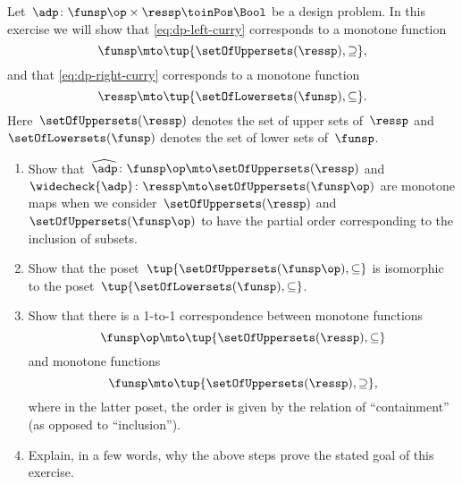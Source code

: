 \begin{gradedexercise}
    \label{ex:CurryingDesignProblems}
    Let~$\adp\colon \funsp\op \times \ressp\toinPos \Bool$ be a design problem.
    In this exercise we will show that \cref{eq:dp-left-curry} corresponds to a monotone function
    \begin{equation}
        \funsp \mto \tup{\setOfUppersets (\ressp), \supseteq},
    \end{equation}
    and that \cref{eq:dp-right-curry} corresponds to a monotone function
    \begin{equation}
        \ressp \mto \tup{\setOfLowersets(\funsp), \subseteq}.
    \end{equation}
    Here~$\setOfUppersets (\ressp)$ denotes the set of upper sets of~$\ressp$ and~$\setOfLowersets(\funsp)$ denotes the set of lower sets of~$\funsp$.

    \begin{enumerate}
        \item Show that~$\widehat{\adp} \colon \funsp\op \mto \setOfUppersets (\ressp)$ and~$\widecheck{\adp} \colon \ressp \mto \setOfUppersets (\funsp\op)$ are monotone maps when we consider~$\setOfUppersets (\ressp)$ and~$\setOfUppersets (\funsp\op)$ to have the partial order corresponding to the inclusion of subsets.
        \item Show that the poset~$\tup{\setOfUppersets (\funsp\op), \subseteq}$ is isomorphic to the poset~$\tup{\setOfLowersets(\funsp), \subseteq}$.
        \item Show that there is a 1-to-1 correspondence between monotone functions
        \begin{equation}
            \funsp\op \mto \tup{\setOfUppersets (\ressp), \subseteq}
        \end{equation}
        and monotone functions
        \begin{equation}
            \funsp \mto \tup{\setOfUppersets (\ressp), \supseteq},
        \end{equation}
        where in the latter poset, the order is given by the relation of ``containment'' (as opposed to ``inclusion'').
        \item Explain, in a few words, why the above steps prove the stated goal of this exercise.
    \end{enumerate}
\end{gradedexercise}

